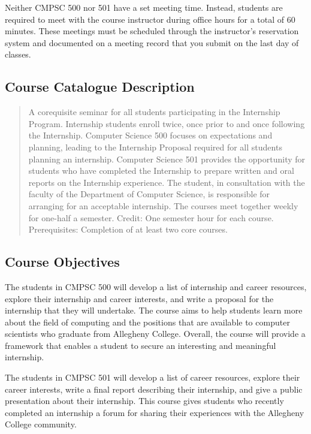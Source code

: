 Neither CMPSC 500 nor 501 have a set meeting time.  Instead, students are required to meet with the course instructor
during office hours for a total of 60 minutes.  These meetings must be scheduled through the instructor's reservation
system and documented on a meeting record that you submit on the last day of classes.

\subsection*{Course Catalogue Description}

\begin{quote}
A corequisite seminar for all students participating in the Internship Program.  Internship students enroll twice, once
prior to and once following the Internship. Computer Science 500 focuses on expectations and planning, leading to the
Internship Proposal required for all students planning an internship.  Computer Science 501 provides the opportunity for
students who have completed the Internship to prepare written and oral reports on the Internship experience. The
student, in consultation with the faculty of the Department of Computer Science, is responsible for arranging for an
acceptable internship.  The courses meet together weekly for one-half a semester. Credit: One semester hour for each
course. Prerequisites: Completion of at least two core courses.
\end{quote}

\subsection*{Course Objectives}

The students in CMPSC 500 will develop a list of internship and career resources, explore their internship and career
interests, and write a proposal for the internship that they will undertake. The course aims to help students
learn more about the field of computing and the positions that are available to computer scientists who graduate from
Allegheny College.  Overall, the course will provide a framework that enables a student to secure an interesting and
meaningful internship.

\noindent
The students in CMPSC 501 will develop a list of career resources, explore their career interests, write a final report
describing their internship, and give a public presentation about their internship.  This course gives
students who recently completed an internship a forum for sharing their experiences with the Allegheny College community.

